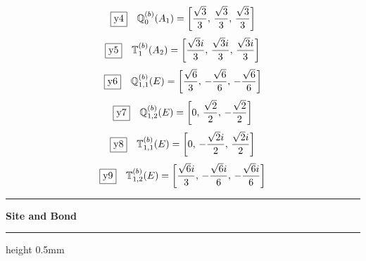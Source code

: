\documentclass[fleqn,10pt,landscape]{jsarticle}
\begin{document}
\begin{dmath*}
\fbox{y4}\quad \mathbb{Q}_{0}^{(b)}(A_{1})=\left[ \frac{\sqrt{3}}{3},\, \frac{\sqrt{3}}{3},\, \frac{\sqrt{3}}{3} \right]
\end{dmath*}
\begin{dmath*}
\fbox{y5}\quad \mathbb{T}_{1}^{(b)}(A_{2})=\left[ \frac{\sqrt{3} i}{3},\, \frac{\sqrt{3} i}{3},\, \frac{\sqrt{3} i}{3} \right]
\end{dmath*}
\begin{dmath*}
\fbox{y6}\quad \mathbb{Q}_{1,1}^{(b)}(E)=\left[ \frac{\sqrt{6}}{3},\, - \frac{\sqrt{6}}{6},\, - \frac{\sqrt{6}}{6} \right]
\end{dmath*}
\begin{dmath*}
\fbox{y7}\quad \mathbb{Q}_{1,2}^{(b)}(E)=\left[ 0,\, \frac{\sqrt{2}}{2},\, - \frac{\sqrt{2}}{2} \right]
\end{dmath*}
\begin{dmath*}
\fbox{y8}\quad \mathbb{T}_{1,1}^{(b)}(E)=\left[ 0,\, - \frac{\sqrt{2} i}{2},\, \frac{\sqrt{2} i}{2} \right]
\end{dmath*}
\begin{dmath*}
\fbox{y9}\quad \mathbb{T}_{1,2}^{(b)}(E)=\left[ \frac{\sqrt{6} i}{3},\, - \frac{\sqrt{6} i}{6},\, - \frac{\sqrt{6} i}{6} \right]
\end{dmath*}
\vspace{5mm}
\noindent \rule[0.5mm]{5mm}{0.5mm}\hspace{3mm}\textbf{Site and Bond}\hspace{3mm}\leaders\hrule height 0.5mm\hfill\kern0pt
\vspace{3mm}
\end{document}
